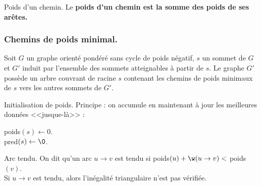 \documentclass[french, 11pt]{article}
\begin{document}
\vspace*{-0.7cm}

\begin{defi}{Poids d'un chemin.}{}
    Le \bf{poids} d'un chemin est la somme des poids de ses arêtes.
\end{defi}

\vspace*{-1cm}

\subsubsection{Chemins de poids minimal.}

\begin{prop}{}{}
    Soit $G$ un graphe orienté pondéré sans cycle de poids négatif, $s$ un sommet de $G$ et $G'$ induit par l'ensemble des sommets atteignables à partir de $s$. Le graphe $G'$ possède un arbre couvrant de racine $s$ contenant les chemins de poids minimaux de $s$ vers les autres sommets de $G'$.
\end{prop}

\vspace*{-0.7cm}

\begin{defi}{Initialisation de poids.}{}
    Principe : on accumule en maintenant à jour les meilleures données <<jusque-là>> :\\
    \hspace*{0.28cm}\begin{algorithm}[H]
        \LinesNumbered
        \caption{Initialisation de poids.}
        poids$(s)\gets0$.\\
        pred$(s)\gets\0$.\\
    \end{algorithm}
\end{defi}

\begin{defi}{Arc tendu.}{}
    On dit qu'un arc $u\to v$ est tendu si poids$(u)+\w(u\to v)<$ poids$(v)$.\\
    Si $u\to v$ est tendu, alors l'inégalité triangulaire n'est pas vérifiée.
\end{defi}

\vspace*{-0.7cm}
\end{document}
